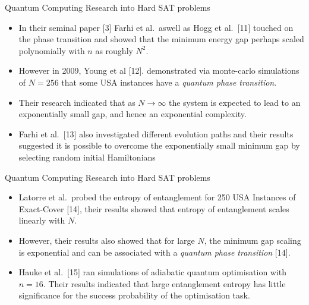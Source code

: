\documentclass[
  ignorenonframetext,
]{beamer}
\providecommand{\tightlist}{%
  \setlength{\itemsep}{0pt}\setlength{\parskip}{0pt}}
\begin{document}
\begin{frame}{Quantum Computing Research into Hard SAT problems}
\protect\hypertarget{quantum-computing-research-into-hard-sat-problems}{}

\begin{itemize}[<+->]
\tightlist
\item
  In their seminal paper {[}3{]} Farhi et al.~aswell as Hogg et
  al.~{[}11{]} touched on the phase transition and showed that the
  minimum energy gap perhaps scaled polynomially with \(n\) as roughly
  \(N^2\).
\item
  However in 2009, Young et al {[}12{]}. demonstrated via monte-carlo
  simulations of \(N=256\) that some USA instances have a \emph{quantum
  phase transition}.
\item
  Their research indicated that as \(N \rightarrow \infty\) the system
  is expected to lead to an exponentially small gap, and hence an
  exponential complexity.
\item
  Farhi et al.~{[}13{]} also investigated different evolution paths and
  their results suggested it is possible to overcome the exponentially
  small minimum gap by selecting random initial Hamiltonians
\end{itemize}

\end{frame}

\begin{frame}{Quantum Computing Research into Hard SAT problems}
\protect\hypertarget{quantum-computing-research-into-hard-sat-problems-1}{}

\begin{itemize}[<+->]
\tightlist
\item
  Latorre et al.~probed the entropy of entanglement for 250 USA
  Instances of Exact-Cover {[}14{]}, their results showed that entropy
  of entanglement scales linearly with \(N\).
\item
  However, their results also showed that for large \(N\), the minimum
  gap scaling is exponential and can be associated with a \emph{quantum
  phase transition} {[}14{]}.
\item
  Hauke et al.~{[}15{]} ran simulations of adiabatic quantum
  optimisation with \(n=16\). Their results indicated that large
  entanglement entropy has little significance for the success
  probability of the optimisation task.
\end{itemize}

\end{frame}
\end{document}
